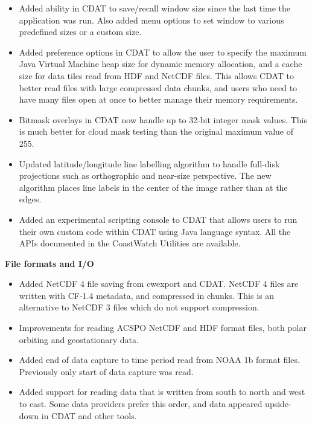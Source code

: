 \begin{itemize}

  \item Added ability in CDAT to save/recall window size since the last time
  the application was run.  Also added menu options to set window to various
  predefined sizes or a custom size.

  \item Added preference options in CDAT to allow the user to specify the
  maximum Java Virtual Machine heap size for dynamic memory allocation, and
  a cache size for data tiles read from HDF and NetCDF files.  This allows CDAT
  to better read files with large compressed data chunks, and users who need to
  have many files open at once to better manage their memory requirements.

  \item Bitmask overlays in CDAT now handle up to 32-bit integer mask values.
  This is much better for cloud mask testing than the original maximum value
  of 255.

  \item Updated latitude/longitude line labelling algorithm to handle full-disk
  projections such as orthographic and near-size perspective.  The new
  algorithm places line labels in the center of the image rather than at the
  edges.

  \item Added an experimental scripting console to CDAT that allows users to
  run their own custom code within CDAT using Java language syntax.  All the
  APIs documented in the CoastWatch Utilities are available.

\end{itemize}

\hspace{0.4cm} {\bf File formats and I/O}

\begin{itemize}

  \item Added NetCDF 4 file saving from cwexport and CDAT.  NetCDF 4 files are
  written with CF-1.4 metadata, and compressed in chunks.  This is an
  alternative to NetCDF 3 files which do not support compression.

  \item Improvements for reading ACSPO NetCDF and HDF format files, both
  polar orbiting and geostationary data.

  \item Added end of data capture to time period read from NOAA 1b format
  files.  Previously only start of data capture was read.

  \item Added support for reading data that is written from south to north
  and west to east.  Some data providers prefer this order, and data appeared
  upside-down in CDAT and other tools.

\end{itemize}


